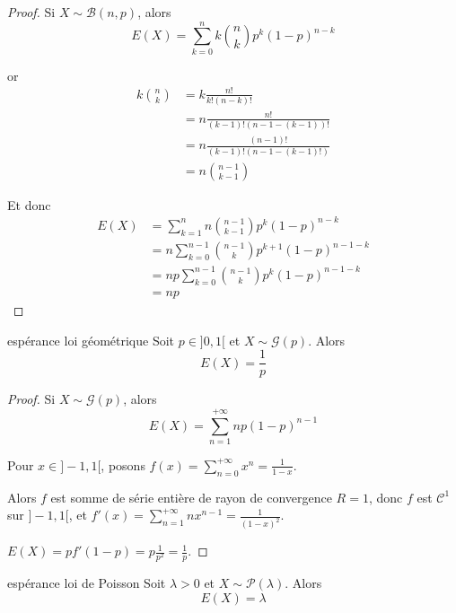 \begin{proof}
    Si $X \sim \mathcal B(n, p)$, alors
       $$ E(X) = \sum_{k = 0}^n k \binom n k p^k (1 - p)^{n - k} $$
    
    or
    \begin{align}
        k \binom n k & = k \frac{n!}{k!(n - k)!} \\
        & = n \frac{n!}{(k - 1)! (n - 1 - (k - 1))!} \\
        & = n \frac{(n - 1)!}{(k - 1)!(n - 1 - (k - 1)!)} \\
        & = n \binom{n - 1}{k - 1}
    \end{align}

    Et donc 
    \begin{align}
        E(X) & = \sum_{k = 1}^n n \binom{n - 1}{k - 1} p^k (1 - p)^{n - k} \\
        & = n \sum_{k = 0 }^{n - 1} \binom{n - 1}{k} p^{k + 1} (1 - p)^{n - 1 - k} \\
        & = n p \sum_{k = 0}^{n - 1} \binom{n - 1}{k} p^k (1 - p)^{n - 1 - k} \\
        & = n p
    \end{align}
        
\end{proof}

\begin{proposition}{espérance loi géométrique}{}
    Soit $p \in ]0, 1[$ et $X \sim \mathcal G(p)$. Alors 
    $$ E(X) = \frac 1 p $$
\end{proposition}

\begin{proof}
    Si $X \sim \mathcal G(p)$, alors 
    $$E(X) = \sum_{n = 1}^{+ \infty} n p (1 - p)^{n - 1}$$

    Pour $x \in ]-1, 1[$, posons $\displaystyle f(x) = \sum_{n = 0}^{+ \infty} x^n = \frac 1 {1 - x}$.

    Alors $f$ est somme de série entière de rayon de convergence $R = 1$, donc 
    $f$ est $\mathscr C^{1}$ sur $]-1, 1[$, et
    $\displaystyle f'(x) = \sum_{n = 1}^{+ \infty} n x^{n - 1} = \frac 1 {(1 - x)^2}$.

    $E(X) = p f'\left( 1 - p \right) = p \frac 1 {p^2} = \frac 1 p$.

\end{proof}

\begin{proposition}{espérance loi de Poisson}{}
    Soit $\lambda > 0$ et $X \sim \mathcal P(\lambda)$. Alors 
    $$ E(X) = \lambda $$
\end{proposition}

